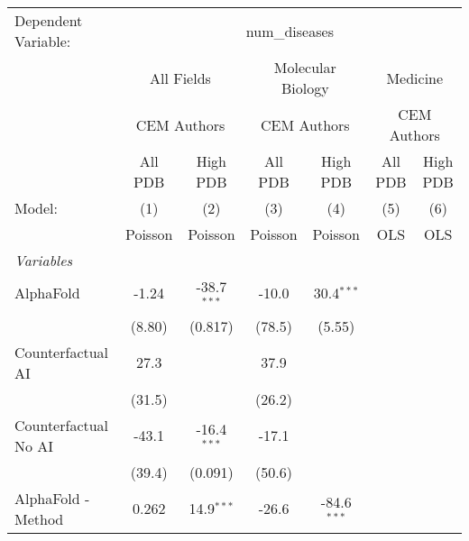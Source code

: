 \begingroup
\centering
\begin{tabular}{lcccccc}
   \tabularnewline \midrule \midrule
   Dependent Variable: & \multicolumn{6}{c}{num\_diseases}\\
 & \multicolumn{2}{c}{All Fields} & \multicolumn{2}{c}{Molecular Biology} & \multicolumn{2}{c}{Medicine} \\
\cmidrule(lr){2-3} \cmidrule(lr){4-5} \cmidrule(lr){6-7}
 & \multicolumn{2}{c}{CEM Authors} & \multicolumn{2}{c}{CEM Authors} & \multicolumn{2}{c}{CEM Authors} \\
\cmidrule(lr){2-3} \cmidrule(lr){4-5} \cmidrule(lr){6-7}
 & \multicolumn{1}{c}{All PDB} & \multicolumn{1}{c}{High PDB} & \multicolumn{1}{c}{All PDB} & \multicolumn{1}{c}{High PDB} & \multicolumn{1}{c}{All PDB} & \multicolumn{1}{c}{High PDB} \\
\cmidrule(lr){2-2} \cmidrule(lr){3-3} \cmidrule(lr){4-4} \cmidrule(lr){5-5} \cmidrule(lr){6-6} \cmidrule(lr){7-7}
   Model:                                                     & (1)      & (2)                   & (3)           & (4)           & (5)  & (6)\\  
                                                              &  Poisson & Poisson               & Poisson       & Poisson       & OLS  & OLS\\  
   \midrule
   \emph{Variables}\\
   AlphaFold                                                  & -1.24    & -38.7$^{***}$         & -10.0         & 30.4$^{***}$  &      &   \\   
                                                              & (8.80)   & (0.817)               & (78.5)        & (5.55)        &      &   \\   
   Counterfactual AI                                          & 27.3     &                       & 37.9          &               &      &   \\   
                                                              & (31.5)   &                       & (26.2)        &               &      &   \\   
   Counterfactual No AI                                       & -43.1    & -16.4$^{***}$         & -17.1         &               &      &   \\   
                                                              & (39.4)   & (0.091)               & (50.6)        &               &      &   \\   
   AlphaFold - Method                                         & 0.262    & 14.9$^{***}$          & -26.6         & -84.6$^{***}$ &      &   \\   

\end{tabular}
